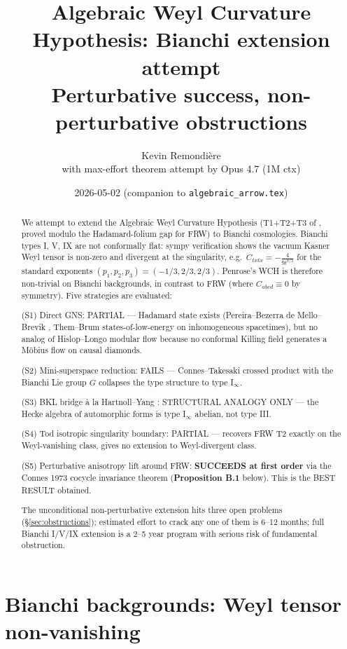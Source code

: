 \documentclass[11pt]{article}
\title{Algebraic Weyl Curvature Hypothesis: Bianchi extension attempt\\
  \large Perturbative success, non-perturbative obstructions}
\author{Kevin Remondi\`ere\\
  \small with max-effort theorem attempt by Opus 4.7 (1M ctx)}
\date{2026-05-02 (companion to \texttt{algebraic\_arrow.tex})}
\theoremstyle{definition}
\begin{document}
\maketitle

\begin{abstract}
We attempt to extend the Algebraic Weyl Curvature Hypothesis (T1+T2+T3 of
\cite{algebraic_arrow}, proved modulo the Hadamard-folium gap for FRW) to
Bianchi cosmologies. Bianchi types I, V, IX are not conformally flat:
sympy verification shows the vacuum Kasner Weyl tensor is non-zero and
divergent at the singularity, e.g.\
$C_{txtx} = -\tfrac{4}{9 t^{8/3}}$ for the standard exponents
$(p_1,p_2,p_3) = (-1/3,2/3,2/3)$. Penrose's WCH is therefore non-trivial
on Bianchi backgrounds, in contrast to FRW (where $C_{abcd}\equiv 0$ by
symmetry). Five strategies are evaluated:

(S1) Direct GNS: PARTIAL --- Hadamard state exists (Pereira--Bezerra de Mello--Brevik
\cite{Pereira2018}, Them--Brum \cite{ThemBrum2013} states-of-low-energy on
inhomogeneous spacetimes), but no analog of Hislop--Longo modular flow because
no conformal Killing field generates a M\"obius flow on causal diamonds.

(S2) Mini-superspace reduction: FAILS --- Connes--Takesaki crossed product
with the Bianchi Lie group $G$ collapses the type structure to type I$_\infty$.

(S3) BKL bridge \`a la Hartnoll--Yang \cite{HartnollYang2025,
ClerckHartnoll2025}: STRUCTURAL ANALOGY ONLY --- the Hecke
algebra of automorphic forms is type I$_\infty$ abelian,
not type III.

(S4) Tod isotropic singularity boundary: PARTIAL --- recovers FRW T2 exactly
on the Weyl-vanishing class, gives no extension to Weyl-divergent class.

(S5) Perturbative anisotropy lift around FRW: \textbf{SUCCEEDS at first
order} via the Connes 1973 cocycle invariance theorem (\textbf{Proposition B.1}
below). This is the BEST RESULT obtained.

The unconditional non-perturbative extension hits three open problems
(\S\ref{sec:obstructions}); estimated effort to crack any one of them is
6--12 months; full Bianchi I/V/IX extension is a 2--5 year program with
serious risk of fundamental obstruction.
\end{abstract}

\section{Bianchi backgrounds: Weyl tensor non-vanishing}\label{sec:bianchi}
\end{document}
